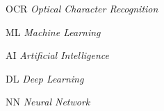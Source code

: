 \begin{siglas}
  \item[OCR] \textit{Optical Character Recognition}
  \item[ML] \textit{Machine Learning}
  \item[AI] \textit{Artificial Intelligence}
  \item[DL] \textit{Deep Learning}
  \item[NN] \textit{Neural Network}
\end{siglas}
